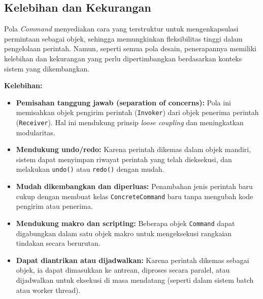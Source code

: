 \subsection{Kelebihan dan Kekurangan}

Pola \textit{Command} menyediakan cara yang terstruktur untuk mengenkapsulasi permintaan sebagai objek, sehingga memungkinkan fleksibilitas tinggi dalam pengelolaan perintah. Namun, seperti semua pola desain, penerapannya memiliki kelebihan dan kekurangan yang perlu dipertimbangkan berdasarkan konteks sistem yang dikembangkan.

\textbf{Kelebihan:}
\begin{itemize}
	\item \textbf{Pemisahan tanggung jawab (separation of concerns):} Pola ini memisahkan objek pengirim perintah (\texttt{Invoker}) dari objek penerima perintah (\texttt{Receiver}). Hal ini mendukung prinsip \textit{loose coupling} dan meningkatkan modularitas.
	
	\item \textbf{Mendukung undo/redo:} Karena perintah dikemas dalam objek mandiri, sistem dapat menyimpan riwayat perintah yang telah dieksekusi, dan melakukan \texttt{undo()} atau \texttt{redo()} dengan mudah.
	
	\item \textbf{Mudah dikembangkan dan diperluas:} Penambahan jenis perintah baru cukup dengan membuat kelas \texttt{ConcreteCommand} baru tanpa mengubah kode pengirim atau penerima.
	
	\item \textbf{Mendukung makro dan scripting:} Beberapa objek \texttt{Command} dapat digabungkan dalam satu objek makro untuk mengeksekusi rangkaian tindakan secara berurutan.
	
	\item \textbf{Dapat diantrikan atau dijadwalkan:} Karena perintah dikemas sebagai objek, ia dapat dimasukkan ke antrean, diproses secara paralel, atau dijadwalkan untuk eksekusi di masa mendatang (seperti dalam sistem batch atau worker thread).
\end{itemize}

